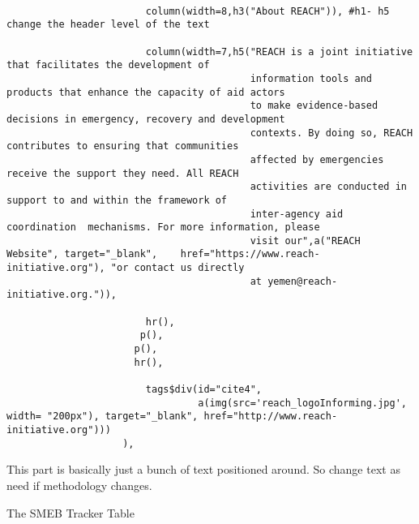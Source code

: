 \documentclass[
]{article}
\begin{document}
\begin{verbatim}
                        
                        column(width=8,h3("About REACH")), #h1- h5 change the header level of the text
                        
                        column(width=7,h5("REACH is a joint initiative that facilitates the development of 
                                          information tools and products that enhance the capacity of aid actors 
                                          to make evidence-based decisions in emergency, recovery and development 
                                          contexts. By doing so, REACH contributes to ensuring that communities 
                                          affected by emergencies receive the support they need. All REACH 
                                          activities are conducted in support to and within the framework of 
                                          inter-agency aid coordination  mechanisms. For more information, please 
                                          visit our",a("REACH Website", target="_blank",    href="https://www.reach-initiative.org"), "or contact us directly 
                                          at yemen@reach-initiative.org.")),
  
                        hr(),
                       p(),
                      p(),
                      hr(),

                        tags$div(id="cite4",
                                 a(img(src='reach_logoInforming.jpg', width= "200px"), target="_blank", href="http://www.reach-initiative.org")))
                    ),
\end{verbatim}

This part is basically just a bunch of text positioned around. So change
text as need if methodology changes.

The SMEB Tracker Table
\end{document}
